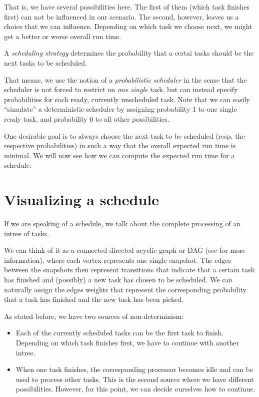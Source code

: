That is, we have several possibilities here. The first of them (which task finishes first) can not be influenced in our scenario. The second, however, leaves us a choice that we can influence. Depending on which task we choose next, we might get a better or worse overall run time.

\begin{definition}
  A \emph{scheduling strategy} determines the probability that a certai tasks should be the next tasks to be scheduled.
\end{definition}

That means, we use the notion of a \emph{probabilistic scheduler} in the sense that the scheduler is not forced to restrict on \emph{one single} task, but can instead specify probabilities for each ready, currently unscheduled task. Note that we can easily ``simulate'' a deterministic scheduler by assigning probability 1 to one single ready task, and probability 0 to all other possibilities.

One desirable goal is to always choose the next task to be scheduled (resp. the respective probabilities) in such a way that the overall expected run time is minimal. We will now see how we can compute the expected run time for a schedule.

\section{Visualizing a schedule}
\label{sec:intro-visualizing-schedules}

If we are speaking of a schedule, we talk about the complete processing of an intree of tasks.

We can think of it as a connected directed acyclic graph or DAG (see \cite{diestel2005graph} for more information), where each vertex represents one single snapshot. The edges between the snapshots then represent transitions that indicate that a certain task has finished and (possibly) a new task has chosen to be scheduled. We can naturally assign the edges weights that represent the corresponding probability that a task has finished and the new task has been picked.

As stated before, we have two sources of non-determinism:
\begin{itemize}
\item Each of the currently scheduled tasks can be the first task to finish. Depending on which task finishes first, we have to continue with another intree.
\item When one task finishes, the corresponding processor becomes idle and can be used to process other tasks. This is the second source where we have different possibilities. However, for this point, we can decide ourselves how to continue.
\end{itemize}

